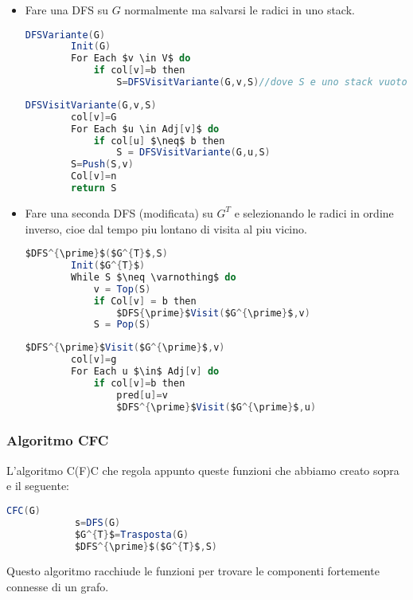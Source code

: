 \begin{itemize}
	\item Fare una DFS su $G$ normalmente ma salvarsi le radici in uno stack.


\begin{lstlisting}[language=Java]
	DFSVariante(G)
		Init(G)
		For Each $v \in V$ do
			if col[v]=b then
				S=DFSVisitVariante(G,v,S)//dove S e uno stack vuoto che viene riempito a ogni radice di sottoalbero
\end{lstlisting}


\begin{lstlisting}[language=Java]
	DFSVisitVariante(G,v,S)
		col[v]=G
		For Each $u \in Adj[v]$ do
			if col[u] $\neq$ b then
				S = DFSVisitVariante(G,u,S)
		S=Push(S,v)
		Col[v]=n
		return S
\end{lstlisting}

\newpage

\item Fare una seconda DFS (modificata) su $G^{T}$ e selezionando le radici in ordine inverso, cioe dal tempo piu lontano di visita al piu vicino.

\begin{lstlisting}[language=Java]
	$DFS^{\prime}$($G^{T}$,S)
		Init($G^{T}$)
		While S $\neq \varnothing$ do
			v = Top(S)
			if Col[v] = b then
				$DFS{\prime}$Visit($G^{\prime}$,v)
			S = Pop(S)
\end{lstlisting}

\begin{lstlisting}[language=Java]
	$DFS^{\prime}$Visit($G^{\prime}$,v)
		col[v]=g
		For Each u $\in$ Adj[v] do
			if col[v]=b then
				pred[u]=v
				$DFS^{\prime}$Visit($G^{\prime}$,u)
\end{lstlisting}
	
\end{itemize}

\subsubsection{Algoritmo CFC}

L'algoritmo C(F)C che regola appunto queste funzioni che abbiamo creato sopra e il seguente:


 \begin{lstlisting}[language=Java]
 		CFC(G)
 			s=DFS(G)
 			$G^{T}$=Trasposta(G)
 			$DFS^{\prime}$($G^{T}$,S)
 \end{lstlisting}

Questo algoritmo racchiude le funzioni per trovare le componenti fortemente connesse di un grafo.

